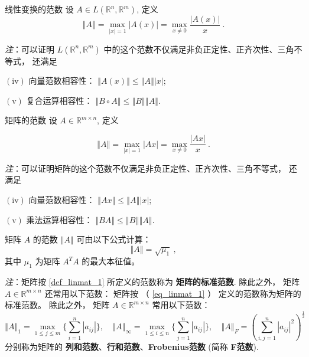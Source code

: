 \begin{definition}{线性变换的范数}
设 $A\in L(\mathbb{R}^{n},\mathbb{R}^{m})$, 定义
\[
\left\Vert A\right\Vert =\max_{|x|=1}|A(x)|=\max_{x\neq0}{\displaystyle \frac{|A(x)|}{x}}~.
\]
\end{definition}
\textsl{注}：可以证明 $L(\mathbb{R}^{n},\mathbb{R}^{m})$ 中的这个范数不仅满足非负正定性、正齐次性、三角不等式，
还满足

$(\mathrm{iv})$ 向量范数相容性： $\left\Vert A(x)\right\Vert \leqslant\left\Vert A\right\Vert \left|x\right|$;

$(\mathrm{v})$ 复合运算相容性： $\left\Vert B\circ A\right\Vert \leqslant\left\Vert B\right\Vert \left\Vert A\right\Vert $.



\begin{definition}{矩阵的范数}\label{def_linmat_1}
设 $A\in\mathbb{R}^{m\times n}$, 定义


\begin{equation}\label{eq_linmat_1}
\left\Vert A\right\Vert =\max_{|x|=1}|Ax|=\max_{x\neq0}{\displaystyle \frac{|Ax|}{x}}~.
\end{equation}


\end{definition}
\textsl{注}：可以证明矩阵的这个范数不仅满足非负正定性、正齐次性、三角不等式， 还满足

$(\mathrm{iv})$ 向量范数相容性： $\left\Vert Ax\right\Vert \leqslant\left\Vert A\right\Vert \left|x\right|$;

$(\mathrm{v})$ 乘法运算相容性： $\left\Vert BA\right\Vert \leqslant\left\Vert B\right\Vert \left\Vert A\right\Vert $.



\begin{theorem}{}
矩阵 $A$ 的范数 $\left\Vert A\right\Vert $ 可由以下公式计算： 
\[
\left\Vert A\right\Vert =\sqrt{\mu_{1}}~,
\]
 其中 $\mu_{1}$ 为矩阵 $A^{T}A$ 的最大本征值。 
\end{theorem}

\textsl{注}：矩阵按 \autoref{def_linmat_1} 所定义的范数称为 \textbf{矩阵的标准范数}. 除此之外， 矩阵 $A\in\mathbb{R}^{m\times n}$ 还常用以下范数：
矩阵按 （ \autoref{eq_linmat_1} ）  定义的范数称为矩阵的标准范数。 除此之外， 矩阵 $A\in\mathbb{R}^{m\times n}$ 常用以下范数：
\[
\left\Vert A\right\Vert _{1}=\max_{1\leqslant j\leqslant m}\{\sum_{i=1}^{n}|a_{ij}|\},\quad\left\Vert A\right\Vert _{\infty}=\max_{1\leqslant i\leqslant n}\{\sum_{j=1}^{n}|a_{ij}|\},\quad\left\Vert A\right\Vert _{F}=\left(\sum_{i,j=1}^{n}|a_{ij}|^{2}\right)^{\frac{1}{2}}~
\]
分别称为矩阵的 \textbf{列和范数}、\textbf{行和范数}、\textbf{Frobenius范数} (简称 \textbf{F范数}). 

